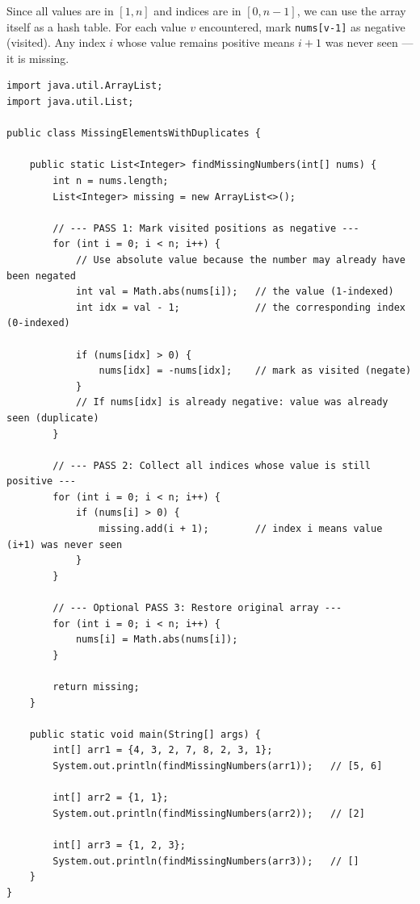 \documentclass[12pt,a4paper,oneside]{book}
\begin{document}
Since all values are in $[1, n]$ and indices are in $[0, n-1]$, we can use the array itself as a hash table. For each value $v$ encountered, mark \texttt{nums[v-1]} as negative (visited). Any index $i$ whose value remains positive means $i+1$ was never seen --- it is missing.

\begin{lstlisting}[caption={Missing Elements With Duplicates --- Negative Marking, O(n) time O(1) space}]
import java.util.ArrayList;
import java.util.List;

public class MissingElementsWithDuplicates {

    public static List<Integer> findMissingNumbers(int[] nums) {
        int n = nums.length;
        List<Integer> missing = new ArrayList<>();

        // --- PASS 1: Mark visited positions as negative ---
        for (int i = 0; i < n; i++) {
            // Use absolute value because the number may already have been negated
            int val = Math.abs(nums[i]);   // the value (1-indexed)
            int idx = val - 1;             // the corresponding index (0-indexed)

            if (nums[idx] > 0) {
                nums[idx] = -nums[idx];    // mark as visited (negate)
            }
            // If nums[idx] is already negative: value was already seen (duplicate)
        }

        // --- PASS 2: Collect all indices whose value is still positive ---
        for (int i = 0; i < n; i++) {
            if (nums[i] > 0) {
                missing.add(i + 1);        // index i means value (i+1) was never seen
            }
        }

        // --- Optional PASS 3: Restore original array ---
        for (int i = 0; i < n; i++) {
            nums[i] = Math.abs(nums[i]);
        }

        return missing;
    }

    public static void main(String[] args) {
        int[] arr1 = {4, 3, 2, 7, 8, 2, 3, 1};
        System.out.println(findMissingNumbers(arr1));   // [5, 6]

        int[] arr2 = {1, 1};
        System.out.println(findMissingNumbers(arr2));   // [2]

        int[] arr3 = {1, 2, 3};
        System.out.println(findMissingNumbers(arr3));   // []
    }
}
\end{lstlisting}
\end{document}
